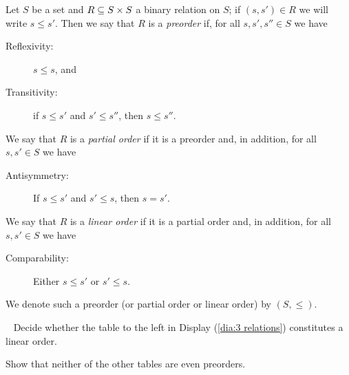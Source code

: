 \begin{definitionENG}\label{def:orders}
Let $S$ be a set and $R\ss S\times S$ a binary relation on $S$; if $(s,s')\in R$ we will write $s\leq s'$. Then we say that $R$ is a {\em preorder} if, for all $s,s',s''\in S$ we have
\begin{description}
\item[Reflexivity:] $s\leq s$, and
\item[Transitivity:] if $s\leq s'$ and $s'\leq s''$, then $s\leq s''$.
\end{description}
We say that $R$ is a {\em partial order} if it is a preorder and, in addition, for all $s,s'\in S$ we have
\begin{description}
\item[Antisymmetry:] If $s\leq s'$ and $s'\leq s$, then $s=s'$.
\end{description}
We say that $R$ is a {\em linear order} if it is a partial order and, in addition, for all $s,s'\in S$ we have
\begin{description}
\item[Comparability:] Either $s\leq s'$ or $s'\leq s$.
\end{description}
We denote such a preorder (or partial order or linear order) by $(S,\leq)$.
\end{definitionENG}

\begin{definitionRUS}\label{def:orders}
\end{definitionRUS}

\begin{exerciseENG}~
\sexc Decide whether the table to the left in Display (\ref{dia:3 relations}) constitutes a linear order. 
\item Show that neither of the other tables are even preorders.
\endsexc
\end{exerciseENG}

\begin{exerciseRUS}~
\end{exerciseRUS}

